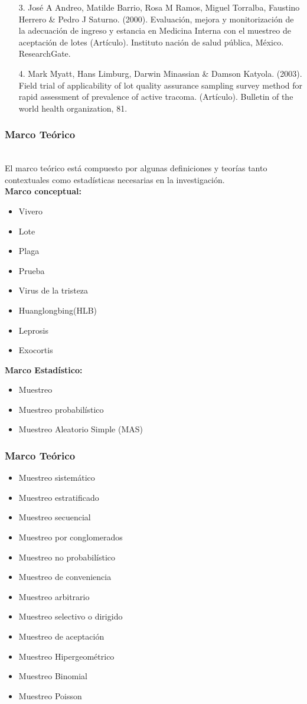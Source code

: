 \documentclass[11pt]{beamer}
\begin{document}
\begin{frame}
\begin{itemize}
\item[3.]José A Andreo, Matilde Barrio, Rosa M Ramos, Miguel Torralba, Faustino Herrero \& Pedro J Saturno. (2000). Evaluación, mejora y monitorización de la adecuación de ingreso y estancia en Medicina Interna con el muestreo de aceptación de lotes (Artículo). Instituto nación de salud pública, México. ResearchGate.
\item[4.]Mark Myatt, Hans Limburg, Darwin Minassian \& Damson Katyola. (2003). Field trial of applicability of lot quality assurance sampling survey method for rapid assessment of prevalence of active tracoma. (Artículo). Bulletin of the world health organization, 81.
\end{itemize}
\end{frame}

\begin{frame}
\frametitle{Marco Teórico}
~\\El marco teórico está compuesto por algunas definiciones y teorías tanto contextuales como estadísticas necesarias en la investigación.
~\\\textbf{Marco conceptual:}
\begin{itemize}
\item Vivero
\item Lote
\item Plaga
\item Prueba
\item Virus de la tristeza
\item Huanglongbing(HLB)
\item Leprosis
\item Exocortis
\end{itemize}
\textbf{Marco Estadístico:}
\begin{itemize}
\item Muestreo
\item Muestreo probabilístico
\item Muestreo Aleatorio Simple (MAS)
\end{itemize}
\end{frame}

\begin{frame}
\frametitle{Marco Teórico}
\begin{itemize}
\item Muestreo sistemático
\item Muestreo estratificado
\item Muestreo secuencial
\item Muestreo por conglomerados
\item Muestreo no probabilístico
\item Muestreo de conveniencia
\item Muestreo arbitrario
\item Muestreo selectivo o dirigido
\item Muestreo de aceptación
\item Muestreo Hipergeométrico
\item Muestreo Binomial
\item Muestreo Poisson
\end{itemize}
\end{frame}
\end{document}
